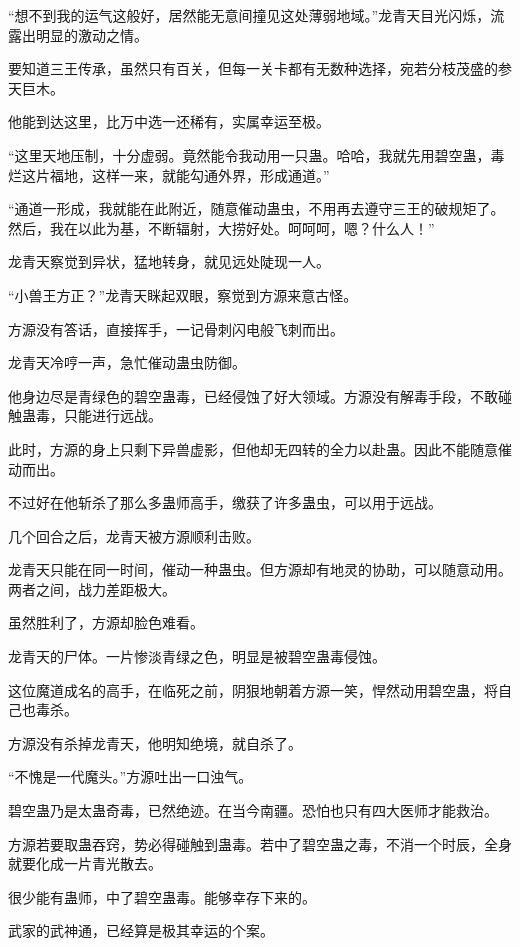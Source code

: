 
\begin{this_body}

“想不到我的运气这般好，居然能无意间撞见这处薄弱地域。”龙青天目光闪烁，流露出明显的激动之情。

要知道三王传承，虽然只有百关，但每一关卡都有无数种选择，宛若分枝茂盛的参天巨木。

他能到达这里，比万中选一还稀有，实属幸运至极。

“这里天地压制，十分虚弱。竟然能令我动用一只蛊。哈哈，我就先用碧空蛊，毒烂这片福地，这样一来，就能勾通外界，形成通道。”

“通道一形成，我就能在此附近，随意催动蛊虫，不用再去遵守三王的破规矩了。然后，我在以此为基，不断辐射，大捞好处。呵呵呵，嗯？什么人！”

龙青天察觉到异状，猛地转身，就见远处陡现一人。

“小兽王方正？”龙青天眯起双眼，察觉到方源来意古怪。

方源没有答话，直接挥手，一记骨刺闪电般飞刺而出。

龙青天冷哼一声，急忙催动蛊虫防御。

他身边尽是青绿色的碧空蛊毒，已经侵蚀了好大领域。方源没有解毒手段，不敢碰触蛊毒，只能进行远战。

此时，方源的身上只剩下异兽虚影，但他却无四转的全力以赴蛊。因此不能随意催动而出。

不过好在他斩杀了那么多蛊师高手，缴获了许多蛊虫，可以用于远战。

几个回合之后，龙青天被方源顺利击败。

龙青天只能在同一时间，催动一种蛊虫。但方源却有地灵的协助，可以随意动用。两者之间，战力差距极大。

虽然胜利了，方源却脸色难看。

龙青天的尸体。一片惨淡青绿之色，明显是被碧空蛊毒侵蚀。

这位魔道成名的高手，在临死之前，阴狠地朝着方源一笑，悍然动用碧空蛊，将自己也毒杀。

方源没有杀掉龙青天，他明知绝境，就自杀了。

“不愧是一代魔头。”方源吐出一口浊气。

碧空蛊乃是太蛊奇毒，已然绝迹。在当今南疆。恐怕也只有四大医师才能救治。

方源若要取蛊吞窍，势必得碰触到蛊毒。若中了碧空蛊之毒，不消一个时辰，全身就要化成一片青光散去。

很少能有蛊师，中了碧空蛊毒。能够幸存下来的。

武家的武神通，已经算是极其幸运的个案。


\end{this_body}
